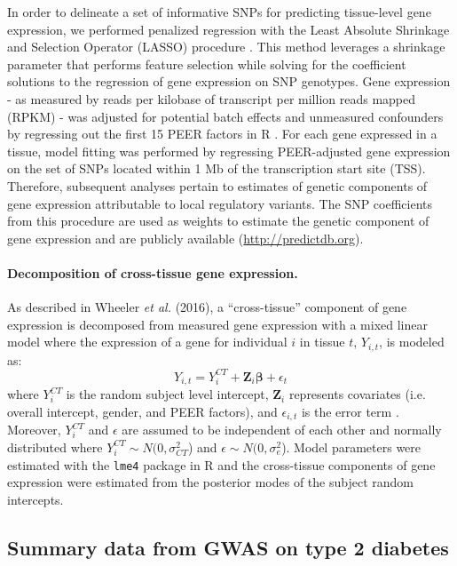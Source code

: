 \documentclass[10pt]{article}
\begin{document}
In order to delineate a set of informative SNPs for predicting tissue-level gene expression, we performed penalized regression with the Least Absolute Shrinkage and Selection Operator (LASSO) procedure \cite{Tibshirani1994}. This method leverages a shrinkage parameter that performs feature selection while solving for the coefficient solutions to the regression of gene expression on SNP genotypes. Gene expression - as measured by reads per kilobase of transcript per million reads mapped (RPKM) - was adjusted for potential batch effects and unmeasured confounders by regressing out the first 15 PEER factors \cite{Stegle2012} in R \cite{RDevelopmentCoreTeam2011a}.  For each gene expressed in a tissue, model fitting was performed by regressing PEER-adjusted gene expression on the set of SNPs located within 1 Mb of the transcription start site (TSS). Therefore, subsequent analyses pertain to estimates of genetic components of gene expression attributable to local regulatory variants. The SNP coefficients from this procedure are used as weights to estimate the genetic component of gene expression and are publicly available (\url{http://predictdb.org}). 

\paragraph{Decomposition of cross-tissue gene expression.} As described in Wheeler \textit{et al.} (2016), a ``cross-tissue'' component of gene expression is decomposed from measured gene expression with a mixed linear model where the expression of a gene for individual $i$ in tissue $t$, $Y_{i,t}$, is modeled as:
\begin{equation}
Y_{i,t} = Y_{i}^{CT} + \mathbf{Z}_{i}\bm{\beta} + \epsilon_{t}
\end{equation}
where $Y_{i}^{CT}$ is the random subject level intercept, $\mathbf{Z}_{i}$ represents covariates (i.e. overall intercept, gender, and PEER factors), and $\epsilon_{i,t}$ is the error term \cite{Wheeler2016}. Moreover, $Y_{i}^{CT}$ and $\epsilon$ are assumed to be independent of each other and normally distributed where $Y_{i}^{CT} \sim N(0,\sigma^{2}_{CT}$) and $\epsilon \sim N(0,\sigma^2_{e}$). Model parameters were estimated with the  \texttt{lme4} package \cite{Bates2015} in R \cite{RDevelopmentCoreTeam2011a} and the cross-tissue components of gene expression were estimated from the posterior modes of the subject random intercepts. 


\subsection*{Summary data from GWAS on type 2 diabetes}
\end{document}
